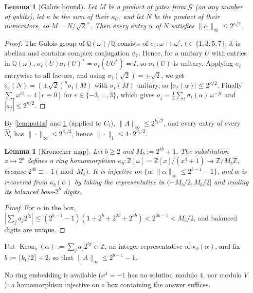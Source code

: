 \documentclass[10pt]{amsart}
\theoremstyle{plain}
\newtheorem{lemma}[theorem]{Lemma}
\theoremstyle{definition}
\theoremstyle{remark}
\numberwithin{equation}{section}
\newcommand{\Z}{\mathbb{Z}}
\newcommand{\Q}{\mathbb{Q}}
\newcommand{\Zw}{\Z[\omega]}
\newcommand{\Kron}{\operatorname{Kron}}
\newcommand{\cG}{\mathcal{G}}
\begin{document}
\begin{lemma}[Galois bound]\label{lem:galois}
Let $M$ be a product of gates from $\cG$ (on any number of qubits), let $\kappa$ be the sum of
their $\kappa_U$, and let $N$ be the product of their numerators, so $M=N/\sqrt2^{\,\kappa}$. Then
every entry $\alpha$ of $N$ satisfies $\|\alpha\|_\infty\le2^{\kappa/2}$.
\end{lemma}

\begin{proof}
The Galois group of $\Q(\omega)/\Q$ consists of $\sigma_t\colon\omega\mapsto\omega^t$, $t\in\{1,3,5,7\}$;
it is abelian and contains complex conjugation $\sigma_7$. Hence, for a unitary $U$ with entries
in $\Q(\omega)$, $\sigma_t(U)\sigma_t(U)^*=\sigma_t(UU^*)=I$, so $\sigma_t(U)$ is unitary. Applying
$\sigma_t$ entrywise to all factors, and using $\sigma_t(\sqrt2)=\pm\sqrt2$, we get
$\sigma_t(N)=(\pm\sqrt2)^{\kappa}\sigma_t(M)$ with $\sigma_t(M)$ unitary, so
$|\sigma_t(\alpha)|\le2^{\kappa/2}$. Finally $\sum_{t}\omega^{rt}=4[r\equiv0]$ for
$r\in\{-3,\dots,3\}$, which gives $a_j=\frac14\sum_t\sigma_t(\alpha)\,\omega^{-jt}$ and
$|a_j|\le2^{\kappa/2}$.
\end{proof}

By \cref{lem:paths} and \cref{lem:galois} (applied to $C_t$), $\|A\|_\infty\le2^{k_t/2}$, and every
entry of every $\hat N_i$ has $\|\cdot\|_\infty\le2^{\hat\kappa_i/2}$, hence $\|\cdot\|_1\le4\cdot2^{\hat\kappa_i/2}$.

\begin{lemma}[Kronecker map]\label{lem:kron}
Let $b\ge2$ and $M_b:=2^{4b}+1$. The substitution $x\mapsto2^b$ defines a ring homomorphism
$\kappa_b\colon\Zw=\Z[x]/(x^4+1)\to\Z/M_b\Z$, because $2^{4b}\equiv-1\pmod{M_b}$. It is injective
on $\{\alpha:\|\alpha\|_\infty\le2^{b-1}-1\}$, and $\alpha$ is recovered from $\kappa_b(\alpha)$ by
taking the representative in $(-M_b/2,M_b/2]$ and reading its balanced base-$2^b$ digits.
\end{lemma}

\begin{proof}
For $\alpha$ in the box, $|\sum_ja_j2^{bj}|\le(2^{b-1}-1)(1+2^b+2^{2b}+2^{3b})<2^{4b-1}<M_b/2$, and
balanced digits are unique.
\end{proof}

Put $\Kron_b(\alpha):=\sum_ja_j2^{bj}\in\Z$, an integer representative of $\kappa_b(\alpha)$, and
fix $b:=\lceil k_t/2\rceil+2$, so that $\|A\|_\infty\le2^{b-1}-1$.

No ring embedding is available ($x^4=-1$ has no solution modulo $4$, nor modulo $V$); a
homomorphism injective on a box containing the answer suffices.
\end{document}
